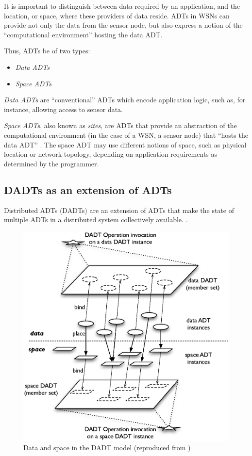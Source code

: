 It is important to distinguish between data required by an application, and
the location, or space, where these providers of data reside. ADTs in WSNs can
provide not only the data from the sensor node, but also express a notion
of the ``computational environment'' hosting the data ADT.

Thus, ADTs be of two types:

\begin{itemize}
  \item \emph{Data ADTs}
  \item \emph{Space ADTs} 
\end{itemize}

\emph{Data ADTs} are ``conventional'' ADTs which encode application logic, such
as, for instance, allowing access to sensor data.

\emph{Space ADTs}, also known as \emph{sites}, are ADTs that provide an
abstraction of the computational environment (in the case of a WSN, a sensor
node) that ``hosts the data ADT'' \cite{migliavacca_DADT:2006}. The space ADT may
use different notions of space, such as physical location or network topology,
depending on application requirements as determined by the programmer.

\subsection{DADTs as an extension of ADTs} \label{subsec:DADTsConcepts}
Distributed ADTs (DADTs) are an extension of ADTs that make the state of multiple ADTs in a
distributed system collectively available.
\cite{migliavacca_DADT:2006}. 

\begin{figure}[h]
\centering
\includegraphics[scale=0.65]{img/DADTs.eps} 
\caption[Data and space in the DADT model]{Data and space in the DADT model (reproduced from 
\cite{migliavacca_DADT:2006})}
\label{Fig:DADTs}
\end{figure}

